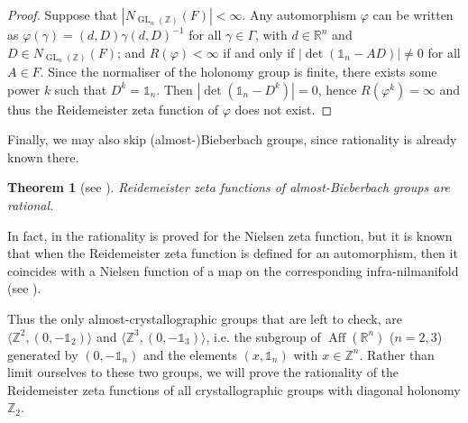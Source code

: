 \documentclass[a4paper]{article}
\theoremstyle{plain}
\newtheorem{theorem}{Theorem}[section]
\theoremstyle{definition}
\theoremstyle{remark}
\DeclareMathOperator{\GL}{GL}
\DeclareMathOperator{\Aff}{Aff}
\newcommand{\I}{\mathds{1}}
\newcommand{\ZZ}{{\mathbb{Z}}}
\newcommand{\RR}{{\mathbb{R}}}
\begin{document}
\begin{proof}
	Suppose that \(|N_{\GL_n(\ZZ)}(F)| < \infty\). Any automorphism \(\varphi\) can be written as \(\varphi(\gamma) = (d,D)\gamma (d,D)^{-1}\) for all \(\gamma \in \Gamma\), with \(d \in \RR^n\) and \(D \in N_{\GL_n(\ZZ)}(F)\); and \(R(\varphi) < \infty\) if and only if \(|\det(\I_n-AD)| \neq 0\) for all \(A \in F\). Since the normaliser of the holonomy group is finite, there exists some power \(k\) such that \(D^k = \I_n\). Then \(|\det(\I_n-D^k)| = 0\), hence \(R(\varphi^k) = \infty\) and thus the Reidemeister zeta function of \(\varphi\) does not exist.
\end{proof}

Finally, we may also skip (almost-)Bieberbach groups, since rationality is already known there.

\begin{theorem}[see {\cite[Corollary 4.7]{dd13-2}}]
	Reidemeister zeta functions of almost-Bieberbach groups are rational.
\end{theorem}

In fact, in \cite{dd13-2} the rationality is proved for the Nielsen zeta function, but it is known that when the Reidemeister zeta function is defined for an automorphism, then it coincides with a Nielsen function of a map on the corresponding infra-nilmanifold (see \cite[Proposition 3.2]{fl15-1}).

\medskip

Thus the only almost-crystallographic groups that are left to check, are \(\langle \ZZ^2, (0,-\I_2)\rangle\) and \(\langle \ZZ^3, (0,-\I_3)\rangle\), i.e. the subgroup of \(\Aff(\RR^n)\) (\(n= 2,3\)) generated by \((0,-\I_n)\) and the elements \((x,\I_n)\) with \(x \in \ZZ^n\). Rather than limit ourselves to these two groups, we will prove the rationality of the Reidemeister zeta functions of all crystallographic groups with diagonal holonomy \(\ZZ_2\).
\end{document}
